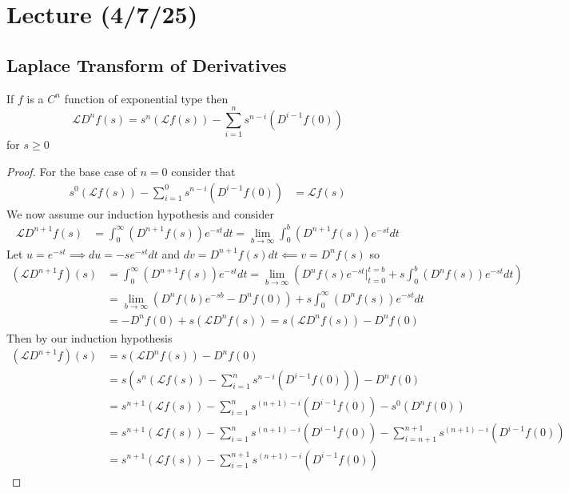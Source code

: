 \documentclass[notes]{subfiles}
\begin{document}
\setcounter{section}{17}
\section{Lecture (4/7/25)}

\subsection{Laplace Transform of Derivatives}
\begin{theorem}
    If $f$ is a $C^n$ function of exponential type then
    \[
        \mathcal{L}D^n f(s) = s^n(\mathcal{L}f(s)) - \sum_{i = 1}^n s^{n - i}(D^{i - 1}f(0))
    \]
    for $s \geq 0$
\end{theorem}
\begin{proof}
    For the base case of $n = 0$ consider that
    \begin{align*}
        s^0(\mathcal{L}f(s)) - \sum_{i = 1}^0 s^{n - i}(D^{i - 1}f(0))
        &= \mathcal{L}f(s)
    \end{align*}
    We now assume our induction hypothesis and consider
    \begin{align*}
        \mathcal{L}D^{n + 1} f(s)
        &= \int_0^\infty (D^{n + 1}f(s))e^{-st}dt
        = \lim_{b\to\infty} \int_0^b (D^{n + 1}f(s))e^{-st}dt
    \end{align*}
    Let $u = e^{-st} \implies du = -se^{-st}dt$ and $dv = D^{n + 1}f(s)dt \impliedby v = D^n f(s)$ so
    \begin{align*}
        (\mathcal{L}D^{n + 1} f)(s)
        &= \int_0^\infty (D^{n + 1}f(s))e^{-st}dt
        = \lim_{b\to\infty} \left( D^n f(s)e^{-st}\Big|_{t = 0}^{t = b} + s\int_0^b (D^n f(s))e^{-st}dt \right) \\
        &= \lim_{b\to\infty} (D^n f(b)e^{-sb} - D^n f(0)) + s\int_0^\infty (D^n f(s))e^{-st}dt \\
        &= -D^n f(0) + s(\mathcal{L}D^n f(s))
        = s(\mathcal{L}D^n f(s)) - D^n f(0)
    \end{align*}
    Then by our induction hypothesis
    \begin{align*}
        (\mathcal{L}D^{n + 1} f)(s)
        &= s(\mathcal{L}D^n f(s)) - D^n f(0) \\
        &= s(s^n(\mathcal{L}f(s)) - \sum_{i = 1}^n s^{n - i}(D^{i - 1}f(0))) - D^n f(0) \\
        &= s^{n + 1}(\mathcal{L}f(s)) - \sum_{i = 1}^n s^{(n + 1) - i}(D^{i - 1}f(0)) - s^0 (D^n f(0)) \\
        &= s^{n + 1}(\mathcal{L}f(s)) - \sum_{i = 1}^n s^{(n + 1) - i}(D^{i - 1}f(0)) - \sum_{i = n + 1}^{n + 1} s^{(n + 1) - i}(D^{i - 1}f(0)) \\
        &= s^{n + 1}(\mathcal{L}f(s)) - \sum_{i = 1}^{n + 1} s^{(n + 1) - i}(D^{i - 1}f(0))
    \end{align*}
\end{proof}
\end{document}
